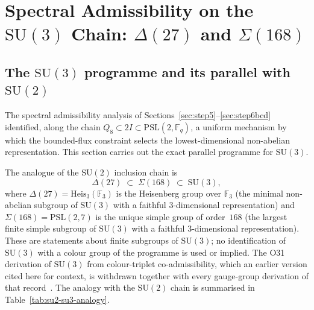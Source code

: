 \documentclass[11pt,a4paper]{article}
\begin{document}
\section{Spectral Admissibility on the $\mathrm{SU}(3)$ Chain:
$\Delta(27)$ and $\Sigma(168)$}
  \label{sec:su3-chain}

  \subsection{The $\mathrm{SU}(3)$ programme and its parallel with $\mathrm{SU}(2)$}
    \label{sec:su3-intro}

    The spectral admissibility analysis of Sections~\ref{sec:step5}--\ref{sec:step6bcd}
    identified, along the chain $Q_8 \subset 2I \subset \mathrm{PSL}(2,\mathbb{F}_q)$, a
    uniform mechanism by which the bounded-flux constraint selects the lowest-dimensional
    non-abelian representation.
    This section carries out the exact parallel programme for $\mathrm{SU}(3)$.

    The analogue of the $\mathrm{SU}(2)$ inclusion chain is
    \begin{equation}
      \Delta(27) \;\subset\; \Sigma(168) \;\subset\; \mathrm{SU}(3),
      \label{eq:su3-chain}
    \end{equation}
    where $\Delta(27) = \mathrm{Heis}_3(\mathbb{F}_3)$ is the Heisenberg group over
    $\mathbb{F}_3$ (the minimal non-abelian subgroup of $\mathrm{SU}(3)$ with a faithful
    $3$-dimensional representation) and $\Sigma(168) = \mathrm{PSL}(2,7)$ is the unique
    simple group of order~$168$ (the largest finite simple subgroup of $\mathrm{SU}(3)$ with
    a faithful $3$-dimensional representation).
    These are statements about finite subgroups of $\mathrm{SU}(3)$; no identification of
    $\mathrm{SU}(3)$ with a colour group of the programme is used or implied.
    The O31 derivation of $\mathrm{SU}(3)$ from colour-triplet co-admissibility, which an earlier
    version cited here for context, is withdrawn together with every gauge-group derivation of
    that record~\cite{Beau2026a35}.
    The analogy with the $\mathrm{SU}(2)$ chain is summarised in
    Table~\ref{tab:su2-su3-analogy}.
\end{document}
